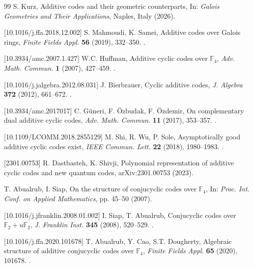 \documentclass{aims}
\numberwithin{equation}{section}
\theoremstyle{definition}
\begin{document}
\begin{thebibliography}{99}
	S. Kurz,
	\newblock Additive codes and their geometric counterparts,
	\newblock In: \textit{Galois Geometries and Their Applications}, Naples, Italy (2026).
	
	[10.1016/j.ffa.2018.12.002]
	S. Mahmoudi, K. Samei,
	\newblock Additive codes over Galois rings,
	\newblock \textit{Finite Fields Appl.} \textbf{56} (2019), 332–350.
	\newblock {}.
	
	[10.3934/amc.2007.1.427]
	W.C. Huffman,
	\newblock Additive cyclic codes over $\mathbb{F}_4$,
	\newblock \textit{Adv. Math. Commun.} \textbf{1} (2007), 427–459.
	\newblock {}.
	
	[10.1016/j.jalgebra.2012.08.031]
	J. Bierbrauer,
	\newblock Cyclic additive codes,
	\newblock \textit{J. Algebra} \textbf{372} (2012), 661–672.
	\newblock {}.
	
	[10.3934/amc.2017017]
	C. Güneri, F. Özbudak, F. Özdemir,
	\newblock On complementary dual additive cyclic codes,
	\newblock \textit{Adv. Math. Commun.} \textbf{11} (2017), 353–357.
	\newblock {}.
	
	[10.1109/LCOMM.2018.2855129]
	M. Shi, R. Wu, P. Sole,
	\newblock Asymptotically good additive cyclic codes exist,
	\newblock \textit{IEEE Commun. Lett.} \textbf{22} (2018), 1980–1983.
	\newblock {}.
	
	[2301.00753]
	R. Dastbasteh, K. Shivji,
	\newblock Polynomial representation of additive cyclic codes and new quantum codes,
	\newblock arXiv:2301.00753 (2023).
	
	T. Abualrub, I. Siap,
	\newblock On the structure of conjucyclic codes over $\mathbb{F}_4$,
	\newblock In: \textit{Proc. Int. Conf. on Applied Mathematics}, pp. 45–50 (2007).
	
	[10.1016/j.jfranklin.2008.01.002]
	I. Siap, T. Abualrub,
	\newblock Conjucyclic codes over $\mathbb{F}_2 + u\mathbb{F}_2$,
	\newblock \textit{J. Franklin Inst.} \textbf{345} (2008), 520–529.
	\newblock {}.
	
	[10.1016/j.ffa.2020.101678]
	T. Abualrub, Y. Cao, S.T. Dougherty,
	\newblock Algebraic structure of additive conjucyclic codes over $\mathbb{F}_4$,
	\newblock \textit{Finite Fields Appl.} \textbf{65} (2020), 101678.
	\newblock {}.
	

\end{thebibliography}
\end{document}
